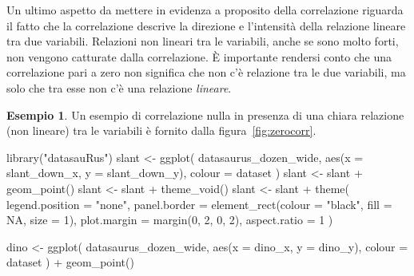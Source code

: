 \documentclass[
  10pt,
  italian,
  a4paper,
  extrafontsizes,onecolumn,openright
  ]{memoir}
\newenvironment{Shaded}{\begin{snugshade}}{\end{snugshade}}
\newcommand{\AttributeTok}[1]{\textcolor[rgb]{0.77,0.63,0.00}{#1}}
\newcommand{\ConstantTok}[1]{\textcolor[rgb]{0.00,0.00,0.00}{#1}}
\newcommand{\DecValTok}[1]{\textcolor[rgb]{0.00,0.00,0.81}{#1}}
\newcommand{\FunctionTok}[1]{\textcolor[rgb]{0.00,0.00,0.00}{#1}}
\newcommand{\NormalTok}[1]{#1}
\newcommand{\OtherTok}[1]{\textcolor[rgb]{0.56,0.35,0.01}{#1}}
\newcommand{\SpecialCharTok}[1]{\textcolor[rgb]{0.00,0.00,0.00}{#1}}
\newcommand{\StringTok}[1]{\textcolor[rgb]{0.31,0.60,0.02}{#1}}
\theoremstyle{definition}
\theoremstyle{definition}
\newtheorem{example}{Esempio}[chapter]
\theoremstyle{definition}
\theoremstyle{definition}
\theoremstyle{remark}
\begin{document}
Un ultimo aspetto da mettere in evidenza a proposito della correlazione riguarda il fatto che la correlazione descrive la direzione e l'intensità della relazione lineare tra due variabili. Relazioni non lineari tra le variabili, anche se sono molto forti, non vengono catturate dalla correlazione. È importante rendersi conto che una correlazione pari a zero non significa che non c'è relazione tra le due variabili, ma solo che tra esse non c'è una relazione \emph{lineare}.

\begin{example}

Un esempio di correlazione nulla in presenza di una chiara relazione (non lineare) tra le variabili è fornito dalla figura~\ref{fig:zerocorr}.

\begin{Shaded}
\begin{Highlighting}[]
\FunctionTok{library}\NormalTok{(}\StringTok{"datasauRus"}\NormalTok{)}
\NormalTok{slant }\OtherTok{\textless{}{-}} \FunctionTok{ggplot}\NormalTok{(}
\NormalTok{  datasaurus\_dozen\_wide,}
  \FunctionTok{aes}\NormalTok{(}\AttributeTok{x =}\NormalTok{ slant\_down\_x, }\AttributeTok{y =}\NormalTok{ slant\_down\_y),}
  \AttributeTok{colour =}\NormalTok{ dataset}
\NormalTok{)}
\NormalTok{slant }\OtherTok{\textless{}{-}}\NormalTok{ slant }\SpecialCharTok{+}
  \FunctionTok{geom\_point}\NormalTok{()}
\NormalTok{slant }\OtherTok{\textless{}{-}}\NormalTok{ slant }\SpecialCharTok{+}
  \FunctionTok{theme\_void}\NormalTok{()}
\NormalTok{slant }\OtherTok{\textless{}{-}}\NormalTok{ slant }\SpecialCharTok{+}
  \FunctionTok{theme}\NormalTok{(}
    \AttributeTok{legend.position =} \StringTok{"none"}\NormalTok{,}
    \AttributeTok{panel.border =} \FunctionTok{element\_rect}\NormalTok{(}\AttributeTok{colour =} \StringTok{"black"}\NormalTok{, }\AttributeTok{fill =} \ConstantTok{NA}\NormalTok{, }\AttributeTok{size =} \DecValTok{1}\NormalTok{),}
    \AttributeTok{plot.margin =} \FunctionTok{margin}\NormalTok{(}\DecValTok{0}\NormalTok{, }\DecValTok{2}\NormalTok{, }\DecValTok{0}\NormalTok{, }\DecValTok{2}\NormalTok{), }\AttributeTok{aspect.ratio =} \DecValTok{1}
\NormalTok{  )}

\NormalTok{dino }\OtherTok{\textless{}{-}} \FunctionTok{ggplot}\NormalTok{(}
\NormalTok{  datasaurus\_dozen\_wide,}
  \FunctionTok{aes}\NormalTok{(}\AttributeTok{x =}\NormalTok{ dino\_x, }\AttributeTok{y =}\NormalTok{ dino\_y),}
  \AttributeTok{colour =}\NormalTok{ dataset}
\NormalTok{) }\SpecialCharTok{+}
  \FunctionTok{geom\_point}\NormalTok{()}


\end{Highlighting}
\end{Shaded}
\end{example}
\end{document}
